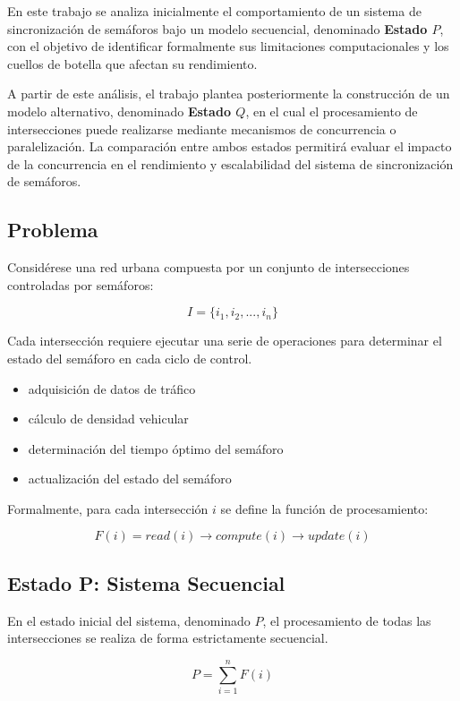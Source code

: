 \documentclass[12pt]{article}
\begin{document}
En este trabajo se analiza inicialmente el comportamiento de un sistema de sincronización de semáforos bajo un modelo secuencial, denominado \textbf{Estado \(P\)}, con el objetivo de identificar formalmente sus limitaciones computacionales y los cuellos de botella que afectan su rendimiento.

A partir de este análisis, el trabajo plantea posteriormente la construcción de un modelo alternativo, denominado \textbf{Estado \(Q\)}, en el cual el procesamiento de intersecciones puede realizarse mediante mecanismos de concurrencia o paralelización. La comparación entre ambos estados permitirá evaluar el impacto de la concurrencia en el rendimiento y escalabilidad del sistema de sincronización de semáforos.

\subsection{Problema}

Considérese una red urbana compuesta por un conjunto de intersecciones controladas por semáforos:

\[
I = \{i_1, i_2, ..., i_n\}
\]

Cada intersección requiere ejecutar una serie de operaciones para determinar el estado del semáforo en cada ciclo de control.

\begin{itemize}
\item adquisición de datos de tráfico
\item cálculo de densidad vehicular
\item determinación del tiempo óptimo del semáforo
\item actualización del estado del semáforo
\end{itemize}

Formalmente, para cada intersección \(i\) se define la función de procesamiento:

\[
F(i) = read(i) \rightarrow compute(i) \rightarrow update(i)
\]

\subsection{Estado P: Sistema Secuencial}

En el estado inicial del sistema, denominado \(P\), el procesamiento de todas las intersecciones se realiza de forma estrictamente secuencial.

\[
P = \sum_{i=1}^{n} F(i)
\]
\end{document}
